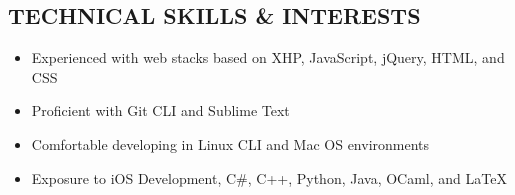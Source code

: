 \documentclass{res}
\begin{document}
\begin{resume}
\section{TECHNICAL SKILLS \& INTERESTS}
\vspace{0.2in}
  \begin{itemize}  \itemsep -2pt
    \item Experienced with web stacks based on XHP, JavaScript, jQuery, HTML, and CSS
    \item Proficient with Git CLI and Sublime Text
    \item Comfortable developing in Linux CLI and Mac OS environments
    \item Exposure to iOS Development, C\#, C++, Python, Java, OCaml, and LaTeX

  \end{itemize}
\end{resume}
\end{document}
